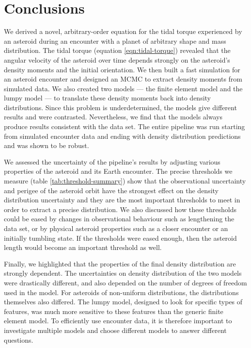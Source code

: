 \documentclass[fleqn,usenatbib]{mnras}
\begin{document}
\section{Conclusions}

We derived a novel, arbitrary-order equation for the tidal torque experienced by an asteroid during an encounter with a planet of arbitrary shape and mass distribution. The tidal torque (equation \ref{eqn:tidal-torque}) revealed that the angular velocity of the asteroid over time depends strongly on the asteroid's density moments and the initial orientation. We then built a fast simulation for an asteroid encounter and designed an MCMC to extract density moments from simulated data. We also created two models --- the finite element model and the lumpy model --- to translate these density moments back into density distributions. Since this problem is underdetermined, the models give different results and were contrasted. Nevertheless, we find that the models always produce results consistent with the data set. The entire pipeline was run starting from simulated encounter data and ending with density distribution predictions and was shown to be robust.

We assessed the uncertainty of the pipeline's results by adjusting various properties of the asteroid and its Earth encounter. The precise thresholds we measure (table \ref{tab:threshold-summary}) show that the observational uncertainty and perigee of the asteroid orbit have the strongest effect on the density distribution uncertainty and they are the most important thresholds to meet in order to extract a precise distribution. We also discussed how these thresholds could be eased by changes in observational behaviour such as lengthening the data set, or by physical asteroid properties such as a closer encounter or an initially tumbling state. If the thresholds were eased enough, then the asteroid length would become an important threshold as well.

Finally, we highlighted that the properties of the final density distribution are strongly dependent. The uncertainties on density distribution of the two models were drastically different, and also depended on the number of degrees of freedom used in the model. For asteroids of non-uniform distributions, the distributions themselves also differed. The lumpy model, designed to look for specific types of features, was much more sensitive to these features than the generic finite element model. To efficiently use encounter data, it is therefore important to investigate multiple models and choose different models to answer different questions.
\end{document}
